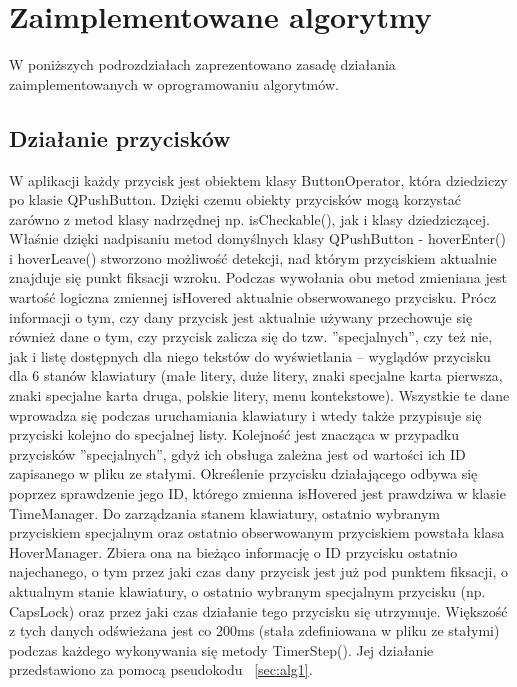 \documentclass[twoside,a4paper]{book}
\begin{document}
\section{Zaimplementowane algorytmy}\label{sec:algorytmy}
W poniższych podrozdziałach zaprezentowano zasadę działania zaimple\-men\-towanych w oprogramowaniu algorytmów. 
\subsection{Działanie przycisków} \label{sec:buttons}
W aplikacji każdy przycisk jest obiektem klasy ButtonOperator, która dzie\-dzi\-czy po klasie QPushButton. Dzięki czemu obiekty przycisków mogą ko\-rzy\-stać zarówno z metod klasy nadrzędnej np. isCheckable(), jak i klasy dzie\-dzi\-czącej. Właśnie dzięki nadpisaniu metod domyślnych klasy QPushButton  -  ho\-ver\-Enter() i hoverLeave() stworzono możliwość detekcji, nad którym przyciskiem aktualnie znajduje się punkt fiksacji wzroku. Podczas wywołania obu metod zmieniana jest wartość logiczna zmiennej isHovered aktualnie obserwowanego przycisku.  Prócz informacji o tym, czy dany przycisk jest aktualnie używany przechowuje się również dane o tym, czy przycisk zalicza się do tzw. ''spe\-cja\-lnych'', czy też nie, jak i listę dostępnych dla niego tekstów do wy\-świe\-tla\-nia – wyglądów przycisku dla 6 stanów kla\-wia\-tu\-ry (małe litery, duże litery, znaki specjalne karta pierwsza, znaki specjalne karta druga, polskie litery, menu kontekstowe). Wszystkie te dane wprowadza się podczas  uruchamiania kla\-wia\-tu\-ry i wtedy także przypisuje się przyciski kolejno do specjalnej listy. Kolejność jest znacząca w przypadku przycisków ''specjalnych'', gdyż ich obsługa zależna jest od wartości ich ID zapisanego w pliku ze stałymi. 
Określenie przycisku działającego odbywa się poprzez sprawdzenie jego ID, którego zmienna isHovered jest prawdziwa w klasie TimeManager. Do zarządzania stanem kla\-wia\-tu\-ry, o\-sta\-tnio wybranym przyciskiem specjalnym oraz ostatnio obserwowanym przyciskiem powstała klasa HoverManager. Zbiera ona na bieżąco informację o  ID przycisku ostatnio najechanego, o tym przez jaki czas dany przycisk jest już pod punktem fiksacji, o aktualnym stanie kla\-wia\-tu\-ry, o os\-ta\-tnio wybranym spe\-cja\-lnym przycisku (np. CapsLock) oraz przez jaki czas działanie tego przycisku się utrzymuje. Większość z tych danych odświeżana jest co 200ms (stała zde\-fi\-nio\-wa\-na w pliku ze stałymi) podczas każdego wykonywania się metody TimerStep(). Jej działanie przedstawiono za pomocą pseudokodu ~\ref{sec:alg1}.
\end{document}
